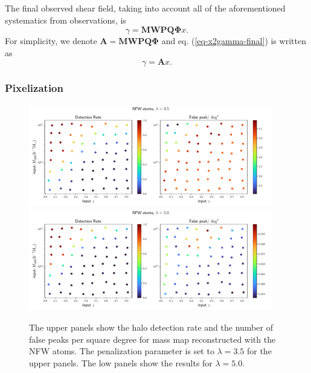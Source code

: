 \documentclass[twocolumn]{aastex62}
\begin{document}
The final observed shear field, taking into account all of the aforementioned systematics from observations,
is
\begin{equation}\label{eq-x2gamma-final}
\gamma =\mathbf{M} \mathbf{W} \mathbf{P} \mathbf{Q} \mathbf{\Phi} x.
\end{equation}
For simplicity, we denote $\mathbf{A}=\mathbf{M} \mathbf{W} \mathbf{P} \mathbf{Q} \mathbf{\Phi} $ and
eq. (\ref{eq-x2gamma-final}) is written as
\begin{equation}\label{eq-x2gamma-simple}
\gamma=\mathbf{A} x.
\end{equation}


\subsubsection{Pixelization}
\label{subsec:method-pixel}

\begin{figure}[!t]
 \centering
 \includegraphics[width=0.95\textwidth]{detfalseRate_f3-1.pdf}
 \includegraphics[width=0.95\textwidth]{detfalseRate_f3-3.pdf}
 \caption{The upper panels show the halo detection rate and the number of false peaks per square degree for mass map 
        reconstructed with the NFW atoms. The penalization parameter is set to $\lambda=3.5$ for the upper panels. 
        The low panels show the results for $\lambda=5.0$. 
        } \label{fig-detFalsRateNFW}
\end{figure}
\end{document}
